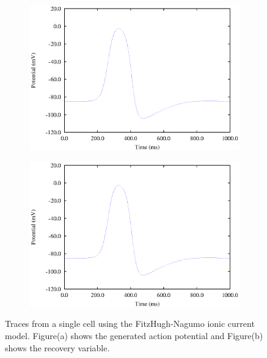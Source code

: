 \begin{figure}[hbtp] 
  \centering
  \begin{subfigure}[b]{0.45\linewidth}
    \centering
    \includegraphics[width=\textwidth]{cardiac_electrophysiology/epsfiles/FHNVm.eps}
    \caption{}
  \end{subfigure}
  \hfill
  \begin{subfigure}[b]{0.45\linewidth}
    \centering
    \includegraphics[width=\textwidth]{cardiac_electrophysiology/epsfiles/FHNVm.eps}
    \caption{}
  \end{subfigure}
  \caption[Traces from a single cell using the FitzHugh-Nagumo ionic current
  model]{Traces from a single cell using the FitzHugh-Nagumo ionic current
    model. Figure(a) shows the generated action potential and Figure(b) shows
    the recovery variable.}
  \label{fig:FHN_1_cell_traces}
\end{figure}
%

